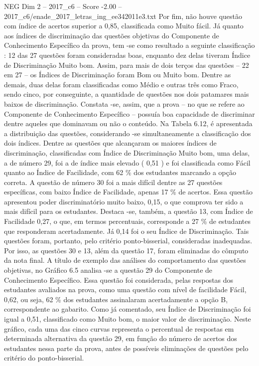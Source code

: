 \begin{textsample}{NEG Dim 2 – 2017\_c6 – Score -2.00 – 2017\_c6/enade\_2017\_letras\_ing\_ee342011e3.txt}
Por fim, não houve questão com índice de acertos superior a 0,85, classificada como Muito fácil.
Já quanto aos índices de discriminação das questões objetivas do Componente de Conhecimento Específico da prova, tem -se como resultado a seguinte classificação : 12 das 27 questões foram consideradas boas, enquanto dez delas tiveram Índice de Discriminação Muito bom.
Assim, para mais de dois terços das questões – 22 em 27 – os Índices de Discriminação foram Bom ou Muito bom.
Dentre as demais, duas delas foram classificadas como Médio e outras três como Fraco, sendo cinco, por conseguinte, a quantidade de questões nos dois patamares mais baixos de discriminação.
Constata -se, assim, que a prova – no que se refere ao Componente de Conhecimento Específico – possuía boa capacidade de discriminar dentre aqueles que dominavam ou não o conteúdo.
Na Tabela 6.12, é apresentada a distribuição das questões, considerando -se simultaneamente a classificação dos dois índices.
Dentre as questões que alcançaram os maiores índices de discriminação, classificadas com Índice de Discriminação Muito bom, uma delas, a de número 29, foi a de índice mais elevado ( 0,51 ) e foi classificada como Fácil quanto ao Índice de Facilidade, com 62 \% dos estudantes marcando a opção correta.
A questão de número 30 foi a mais difícil dentre as 27 questões específicas, com baixo Índice de Facilidade, apenas 17 \% de acertos.
Essa questão apresentou poder discriminatório muito baixo, 0,15, o que comprova ter sido a mais difícil para os estudantes.
Destaca -se, também, a questão 13, com Índice de Facilidade 0,27, o que, em termos percentuais, corresponde a 27 \% de estudantes que responderam acertadamente.
Já 0,14 foi o seu Índice de Discriminação.
Tais questões foram, portanto, pelo critério ponto-bisserial, consideradas inadequadas.
Por isso, as questões 30 e 13, além da questão 17, foram eliminadas do cômputo da nota final.
A título de exemplo das análises do comportamento das questões objetivas, no Gráfico 6.5 analisa -se a questão 29 do Componente de Conhecimento Específico.
Essa questão foi considerada, pelas respostas dos estudantes avaliados na prova, como uma questão com nível de facilidade Fácil, 0,62, ou seja, 62 \% dos estudantes assinalaram acertadamente a opção B, correspondente ao gabarito.
Como já comentado, seu Índice de Discriminação foi igual a 0,51, classificado como Muito bom, o maior valor de discriminação.
Neste gráfico, cada uma das cinco curvas representa o percentual de respostas em determinada alternativa da questão 29, em função do número de acertos dos estudantes nessa parte da prova, antes de possíveis eliminações de questões pelo critério do ponto-bisserial.

\end{textsample}
